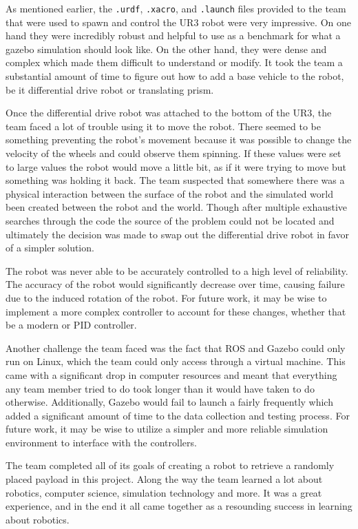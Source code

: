     As mentioned earlier, the \lstinline!.urdf!, \lstinline!.xacro!, and \lstinline!.launch! files provided to the team that were used to spawn and control the UR3 robot were very impressive. On one hand they were incredibly robust and helpful to use as a benchmark for what a gazebo simulation should look like. On the other hand, they were dense and complex which made them difficult to understand or modify. It took the team a substantial amount of time to figure out how to add a base vehicle to the robot, be it differential drive robot or translating prism. 
    
    Once the differential drive robot was attached to the bottom of the UR3, the team faced a lot of trouble using it to move the robot. There seemed to be something preventing the robot's movement because it was possible to change the velocity of the wheels and could observe them spinning. If these values were set to large values the robot would move a little bit, as if it were trying to move but something was holding it back. The team suspected that somewhere there was a physical interaction between the surface of the robot and the simulated world been created between the robot and the world. Though after multiple exhaustive searches through the code the source of the problem could not be located and ultimately the decision was made to swap out the differential drive robot in favor of a simpler solution.
    
    The robot was never able to be accurately controlled to a high level of reliability. The accuracy of the robot would significantly decrease over time, causing failure due to the induced rotation of the robot. For future work, it may be wise to implement a more complex controller to account for these changes, whether that be a modern or PID controller. 
    
    Another challenge the team faced was the fact that ROS and Gazebo could only run on Linux, which the team could only access through a virtual machine. This came with a significant drop in computer resources and meant that everything any team member tried to do took longer than it would have taken to do otherwise. Additionally, Gazebo would fail to launch a fairly frequently which added a significant amount of time to the data collection and testing process. For future work, it may be wise to utilize a simpler and more reliable simulation environment to interface with the controllers. 
    
    The team completed all of its goals of creating a robot to retrieve a randomly placed payload in this project. Along the way the team learned a lot about robotics, computer science, simulation technology and more. It was a great experience, and in the end it all came together as a resounding success in learning about robotics.
    
